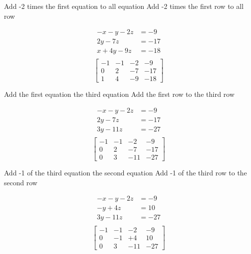 \documentclass[a4paper, 12pt]{article}
\begin{document}
\begin{multicols}{2} 
Add -2 times the first equation to all equation
\break
Add -2 times the first row to all row
\end{multicols}

\begin{multicols}{2}
\begin{align*}
-x  -y - 2z &= -9 \\
2y - 7z &= -17 \\
x + 4y - 9z  &= -18\\
\end{align*}
\break
\[ \left[ {\begin{array}{cccc}
-1 & -1 & -2 & -9 \\
0 & 2 & -7 & -17 \\
1 & 4 & -9 & -18 
\end{array}} \right] \]
\end{multicols} 

\begin{multicols}{2} 
Add the first equation the third equation
\break
Add the first row to the third row
\end{multicols}

\begin{multicols}{2}
\begin{align*}
-x  -y - 2z &= -9 \\
2y - 7z &= -17 \\
3y - 11z  &= -27\\
\end{align*}
\break
\[ \left[ {\begin{array}{cccc}
-1 & -1 & -2 & -9 \\
0 & 2 & -7 & -17 \\
0 & 3 & -11 & -27 
\end{array}} \right] \]
\end{multicols} 

\begin{multicols}{2} 
Add -1 of the third equation the second equation
\break
Add -1 of the third row to the second row
\end{multicols} 

\begin{multicols}{2}
\begin{align*}
-x  -y - 2z &= -9 \\
-y + 4z &= 10 \\
3y - 11z  &= -27\\
\end{align*}
\break
\[ \left[ {\begin{array}{cccc}
-1 & -1 & -2 & -9 \\
0 & -1 & +4 & 10 \\
0 & 3 & -11 & -27 
\end{array}} \right] \]
\end{multicols} 
\end{document}
